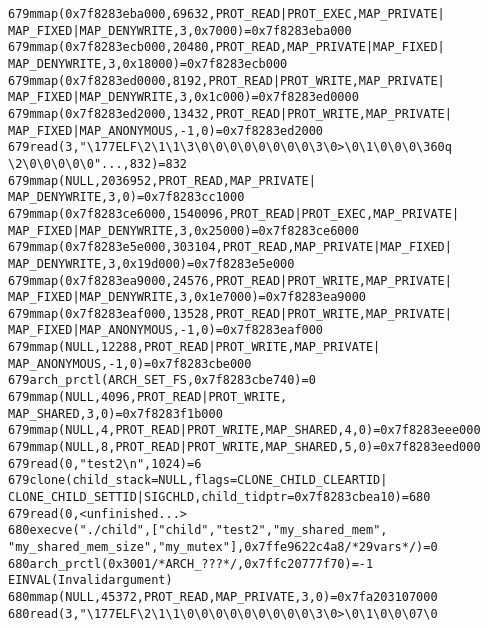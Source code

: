 \documentclass[pdf, unicode, 12pt, a4paper,oneside,fleqn]{article}
\begin{document}
\begin{alltt}
679   mmap(0x7f8283eba000, 69632, PROT_READ|PROT_EXEC, MAP_PRIVATE|
MAP_FIXED|MAP_DENYWRITE, 3, 0x7000) = 0x7f8283eba000
679   mmap(0x7f8283ecb000, 20480, PROT_READ, MAP_PRIVATE|MAP_FIXED|
MAP_DENYWRITE, 3, 0x18000) = 0x7f8283ecb000
679   mmap(0x7f8283ed0000, 8192, PROT_READ|PROT_WRITE, MAP_PRIVATE|
MAP_FIXED|MAP_DENYWRITE, 3, 0x1c000) = 0x7f8283ed0000
679   mmap(0x7f8283ed2000, 13432, PROT_READ|PROT_WRITE, MAP_PRIVATE|
MAP_FIXED|MAP_ANONYMOUS, -1, 0) = 0x7f8283ed2000
679   read(3, "\textbackslash177ELF\textbackslash2\textbackslash1\textbackslash1\textbackslash3\textbackslash0\textbackslash0\textbackslash0\textbackslash0\textbackslash0\textbackslash0\textbackslash0\textbackslash0\textbackslash3\textbackslash0>\textbackslash0\textbackslash1\textbackslash0\textbackslash0\textbackslash0\textbackslash360q
\textbackslash2\textbackslash0\textbackslash0\textbackslash0\textbackslash0\textbackslash0"..., 832) = 832
679   mmap(NULL, 2036952, PROT_READ, MAP_PRIVATE|
MAP_DENYWRITE, 3, 0) = 0x7f8283cc1000
679   mmap(0x7f8283ce6000, 1540096, PROT_READ|PROT_EXEC, MAP_PRIVATE|
MAP_FIXED|MAP_DENYWRITE, 3, 0x25000) = 0x7f8283ce6000
679   mmap(0x7f8283e5e000, 303104, PROT_READ, MAP_PRIVATE|MAP_FIXED|
MAP_DENYWRITE, 3, 0x19d000) = 0x7f8283e5e000
679   mmap(0x7f8283ea9000, 24576, PROT_READ|PROT_WRITE, MAP_PRIVATE|
MAP_FIXED|MAP_DENYWRITE, 3, 0x1e7000) = 0x7f8283ea9000
679   mmap(0x7f8283eaf000, 13528, PROT_READ|PROT_WRITE, MAP_PRIVATE|
MAP_FIXED|MAP_ANONYMOUS, -1, 0) = 0x7f8283eaf000
679   mmap(NULL, 12288, PROT_READ|PROT_WRITE, MAP_PRIVATE|
MAP_ANONYMOUS, -1, 0) = 0x7f8283cbe000
679   arch_prctl(ARCH_SET_FS, 0x7f8283cbe740) = 0
679   mmap(NULL, 4096, PROT_READ|PROT_WRITE, 
MAP_SHARED, 3, 0) = 0x7f8283f1b000
679   mmap(NULL, 4, PROT_READ|PROT_WRITE, MAP_SHARED, 4, 0) = 0x7f8283eee000
679   mmap(NULL, 8, PROT_READ|PROT_WRITE, MAP_SHARED, 5, 0) = 0x7f8283eed000
679   read(0, "test2\textbackslash{n}", 1024)          = 6
679   clone(child_stack=NULL, flags=CLONE_CHILD_CLEARTID|
CLONE_CHILD_SETTID|SIGCHLD, child_tidptr=0x7f8283cbea10) = 680
679   read(0,  <unfinished ...>
680   execve("./child", ["child", "test2", "my_shared_mem",
"my_shared_mem_size","my_mutex"], 0x7ffe9622c4a8 /* 29 vars */) = 0
680   arch_prctl(0x3001 /* ARCH_??? */, 0x7ffc20777f70) = -1 
EINVAL (Invalid argument)
680   mmap(NULL, 45372, PROT_READ, MAP_PRIVATE, 3, 0) = 0x7fa203107000
680   read(3, "\textbackslash177ELF\textbackslash2\textbackslash1\textbackslash1\textbackslash0\textbackslash0\textbackslash0\textbackslash0\textbackslash0\textbackslash0\textbackslash0\textbackslash0\textbackslash0\textbackslash3\textbackslash0>\textbackslash0\textbackslash1\textbackslash0\textbackslash0\textbackslash0 7\textbackslash0

\end{alltt}
\end{document}
